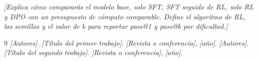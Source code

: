 \documentclass[10pt,letterpaper]{article}
\newcommand{\campo}[1]{\textcolor[gray]{0.36}{\textit{[#1]}}}
\begin{document}
\campo{Explica cómo compararás el modelo base, solo SFT, SFT seguido de RL, solo RL y DPO con un presupuesto de cómputo comparable. Define el algoritmo de RL, las semillas y el valor de k para reportar pass@1 y pass@k por dificultad.}


\renewcommand{\refname}{Referencias}
\begin{thebibliography}{9}
   \campo{Autores}. \campo{Título del primer trabajo}. \campo{Revista o conferencia}, \campo{año}.
   \campo{Autores}. \campo{Título del segundo trabajo}. \campo{Revista o conferencia}, \campo{año}.
\end{thebibliography}
\end{document}
